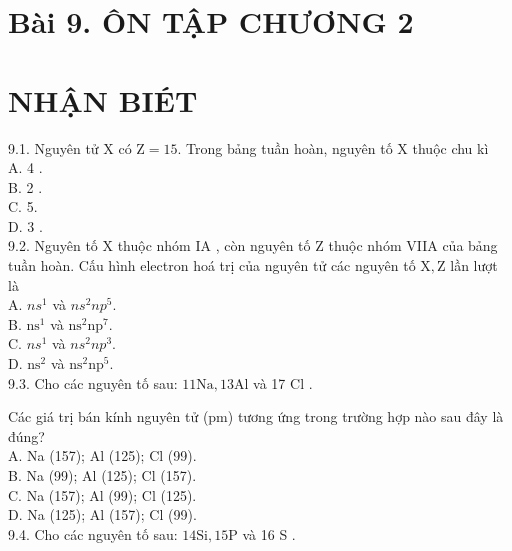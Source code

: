 \documentclass[10pt]{article}
\begin{document}
\section*{Bài 9. ÔN TẬP CHƯƠNG 2}
\section*{NHẬN BIÉT}
9.1. Nguyên tử X có $\mathrm{Z}=15$. Trong bảng tuần hoàn, nguyên tố X thuộc chu kì\\
A. 4 .\\
B. 2 .\\
C. 5.\\
D. 3 .\\
9.2. Nguyên tố X thuộc nhóm IA , còn nguyên tố Z thuộc nhóm VIIA của bảng tuần hoàn. Cấu hình electron hoá trị của nguyên tử các nguyên tố $\mathrm{X}, \mathrm{Z}$ lần lượt là\\
A. $n s^{1}$ và $n s^{2} n p^{5}$.\\
B. $\mathrm{ns}{ }^{1}$ và $\mathrm{ns}^{2} \mathrm{np}^{7}$.\\
C. $n s^{1}$ và $n s^{2} n p^{3}$.\\
D. $\mathrm{ns}^{2}$ và $\mathrm{ns}^{2} \mathrm{np}^{5}$.\\
9.3. Cho các nguyên tố sau: $11 \mathrm{Na}, 13 \mathrm{Al}$ và 17 Cl .

Các giá trị bán kính nguyên tử (pm) tương ứng trong trường hợp nào sau đây là đúng?\\
A. Na (157); Al (125); Cl (99).\\
B. Na (99); Al (125); Cl (157).\\
C. Na (157); Al (99); Cl (125).\\
D. Na (125); Al (157); Cl (99).\\
9.4. Cho các nguyên tố sau: $14 \mathrm{Si}, 15 \mathrm{P}$ và 16 S .
\end{document}

